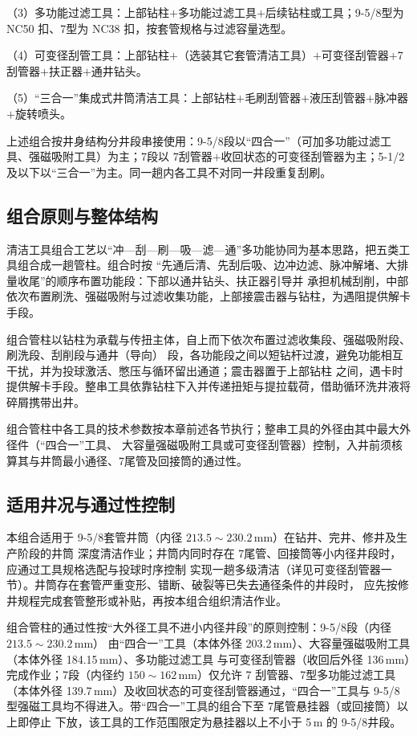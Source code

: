（3）多功能过滤工具：上部钻柱$+$多功能过滤工具$+$后续钻柱或工具；9-5/8\inch 型为 NC50 扣、7\inch 型为 NC38 扣，按套管规格与过滤容量选型。

（4）可变径刮管工具：上部钻柱$+$（选装其它套管清洁工具）$+$可变径刮管器$+$7\inch 刮管器$+$扶正器$+$通井钻头。

（5）“三合一”集成式井筒清洁工具：上部钻柱$+$毛刷刮管器$+$液压刮管器$+$脉冲器$+$旋转喷头。

上述组合按井身结构分井段串接使用：9-5/8\inch 段以“四合一”（可加多功能过滤工具、强磁吸附工具）为主；7\inch 段以 7\inch 刮管器$+$收回状态的可变径刮管器为主；5-1/2\inch 及以下以“三合一”为主。同一趟内各工具不对同一井段重复刮刷。

\subsection{组合原则与整体结构}

清洁工具组合工艺以“冲—刮—刷—吸—滤—通”多功能协同为基本思路，把五类工具组合成一趟管柱。组合时按
“先通后清、先刮后吸、边冲边滤、脉冲解堵、大排量收尾”的顺序布置功能段：下部以通井钻头、扶正器引导并
承担机械刮削，中部依次布置刷洗、强磁吸附与过滤收集功能，上部接震击器与钻柱，为遇阻提供解卡手段。

组合管柱以钻柱为承载与传扭主体，自上而下依次布置过滤收集段、强磁吸附段、刷洗段、刮削段与通井（导向）
段，各功能段之间以短钻杆过渡，避免功能相互干扰，并为投球激活、憋压与循环留出通道；震击器置于上部钻柱
之间，遇卡时提供解卡手段。整串工具依靠钻柱下入并传递扭矩与提拉载荷，借助循环洗井液将碎屑携带出井。

组合管柱中各工具的技术参数按本章前述各节执行；整串工具的外径由其中最大外径件（“四合一”工具、
大容量强磁吸附工具或可变径刮管器）控制，入井前须核算其与井筒最小通径、7\inch 尾管及回接筒的通过性。

\subsection{适用井况与通过性控制}

本组合适用于 9-5/8\inch 套管井筒（内径 $213.5\sim230.2$\,mm）在钻井、完井、修井及生产阶段的井筒
深度清洁作业；井筒内同时存在 7\inch 尾管、回接筒等小内径井段时，应通过工具规格选配与投球时序控制
实现一趟多级清洁（详见可变径刮管器一节）。井筒存在套管严重变形、错断、破裂等已失去通径条件的井段时，
应先按修井规程完成套管整形或补贴，再按本组合组织清洁作业。

组合管柱的通过性按“大外径工具不进小内径井段”的原则控制：9-5/8\inch 段（内径 $213.5\sim230.2$\,mm）
由“四合一”工具（本体外径 203.2\,mm）、大容量强磁吸附工具（本体外径 184.15\,mm）、多功能过滤工具
与可变径刮管器（收回后外径 136\,mm）完成作业；7\inch 段（内径约 $150\sim162$\,mm）仅允许 7\inch
刮管器、7\inch 型多功能过滤工具（本体外径 139.7\,mm）及收回状态的可变径刮管器通过，“四合一”工具与
9-5/8\inch 型强磁工具均不得进入。带“四合一”工具的组合下至 7\inch 尾管悬挂器（或回接筒）以上即停止
下放，该工具的工作范围限定为悬挂器以上不小于 5\,m 的 9-5/8\inch 井段。

